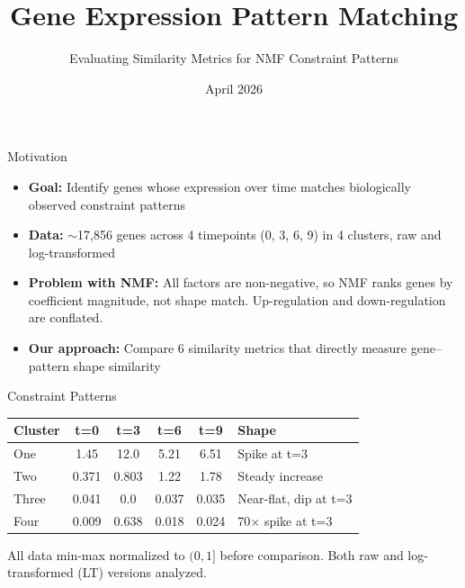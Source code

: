 \documentclass[aspectratio=169,12pt,handout]{beamer}
\title{Gene Expression Pattern Matching}
\subtitle{Evaluating Similarity Metrics for NMF Constraint Patterns}
\author{}
\institute{Binghamton University}
\date{April 2026}
\begin{document}
\begin{frame}
\titlepage
\end{frame}

\begin{frame}{Motivation}
\begin{itemize}
  \item \textbf{Goal:} Identify genes whose expression over time matches
        biologically observed constraint patterns
  \item \textbf{Data:} $\sim$17,856 genes across 4 timepoints (0, 3, 6, 9)
        in 4 clusters, raw and log-transformed
  \item \textbf{Problem with NMF:} All factors are non-negative, so NMF
        ranks genes by coefficient magnitude, not shape match.
        Up-regulation and down-regulation are conflated.
  \item \textbf{Our approach:} Compare 6 similarity metrics that directly
        measure gene--pattern shape similarity
\end{itemize}
\end{frame}

\begin{frame}{Constraint Patterns}
\begin{center}
\begin{tabular}{lccccl}
\toprule
\textbf{Cluster} & \textbf{t=0} & \textbf{t=3} & \textbf{t=6} & \textbf{t=9} & \textbf{Shape} \\
\midrule
One   & 1.45  & 12.0  & 5.21  & 6.51  & Spike at t=3 \\
Two   & 0.371 & 0.803 & 1.22  & 1.78  & Steady increase \\
Three & 0.041 & 0.0   & 0.037 & 0.035 & Near-flat, dip at t=3 \\
Four  & 0.009 & 0.638 & 0.018 & 0.024 & 70$\times$ spike at t=3 \\
\bottomrule
\end{tabular}
\end{center}

\vspace{0.5em}
\small
All data min-max normalized to $(0, 1]$ before comparison.
Both raw and log-transformed (LT) versions analyzed.
\end{frame}
\end{document}

